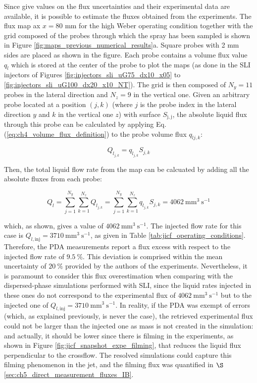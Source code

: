 Since  give values on the flux uncertainties and their experimental data are available, it is possible to estimate the fluxes obtained from the experiments. The flux map ax $x = 80$ mm for the high Weber operating condition together with the grid composed of the probes through which the spray has been sampled is shown in Figure \ref{fig:maps_previous_numerical_results}a. Square probes with 2 mm sides are placed as shown in the figure. Each probe contains a volume flux value $q_l$ which is stored at the center of the probe to plot the maps (as done in the SLI injectors of Figures 
\ref{fig:injectors_sli_uG75_dx10_x05} to \ref{fig:injectors_sli_uG100_dx20_x10_NT}). The grid is then composed of $N_y = 11$ probes in the lateral direction and $N_z = 9$ in the vertical one. Given an arbitrary probe located at a position $\left( j,k \right)$ (where $j$ is the probe index in the lateral direction $y$ and $k$ in the vertical one $z$) with surface $S_\mathrm{j,j}$, the absolute liquid flux through this probe can be calculated by applying Eq. (\ref{eq:ch4_volume_flux_definition}) to the probe volume flux $q_{l{j,k}}$:

\begin{equation}
Q_{l_{j,k}} = q_{l_{j,k}} S_{j,k}
\end{equation}

Then, the total liquid flow rate from the map can be calcuated by adding all the absolute fluxes from each probe:

\begin{equation}
Q_{l} = \sum_{j=1}^{N_y} \sum_{k=1}^{N_z} Q_{l_{j,k}} = \sum_{j=1}^{N_y} \sum_{k=1}^{N_z} q_{l_{j,k}} S_{j,k} = 4062 ~ \mathrm{mm}^3~\mathrm{s}^{-1}
\end{equation}

which, as shown, gives a value of $4062 ~ \mathrm{mm}^3~\mathrm{s}^{-1}$. The injected flow rate for this case is $Q_{l,\mathrm{inj}} = 3710~ \mathrm{mm}^3~\mathrm{s}^{-1}$, as given in Table \ref{tab:jicf_operating_conditions}. Therefore, the PDA measurements report a flux excess with respect to the injected flow rate of $9.5~\%$. This deviation is comprised within the mean uncertainty of $20~\%$ provided by the authors of the experiments. Nevertheless, it is paramount to consider this flux overestimation when comparing with the dispersed-phase simulations performed with SLI, since the liquid rates injected in these ones do not correspond to the experimental flux of $4062 ~ \mathrm{mm}^3~\mathrm{s}^{-1}$ but to the injected one of $Q_{l,\mathrm{inj}} = 3710~ \mathrm{mm}^3~\mathrm{s}^{-1}$. In reality, if the PDA was exempt of errors (which, as explained previously, is never the case), the retrieved experimental flux could not be larger than the injected one as mass is not created in the simulation: and actually, it should be lower since there is filming in the experiments, as shown in Figure \ref{fig:jicf_snapshot_expe_filming}, that reduces the liquid flux perpendicular to the crossflow. The resolved simulations could capture this filming phenomenon in the jet, and the filming flux was quantified in $\S$\ref{sec:ch5_direct_measurement_fluxes_IB}.


